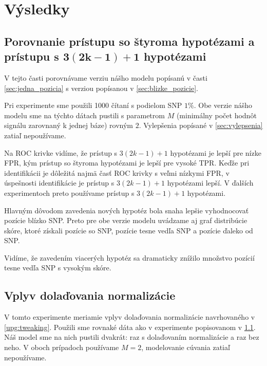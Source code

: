 \section{Výsledky}

\subsection[Porovnanie prístupu so štyroma hypotézami a prístupu s $3(2k-1)+1$ hypotézami]{Porovnanie prístupu so štyroma hypotézami a prístupu s $\boldsymbol{3(2k-1)+1}$ hypotézami}
\label{exp:4vsMany}
V tejto časti porovnávame verziu nášho modelu popísanú v časti \ref{sec:jedna_pozicia} s
verziou popísanou v \ref{sec:blizke_pozicie}.

Pri experimente sme použili 1000 čítaní s podielom SNP $1\%$.   Obe verzie nášho modelu sme na týchto dátach pustili s parametrom $M$ (minimálny počet hodnôt signálu zarovnaný k jednej báze) rovným $2$.
Vylepšenia popísané v \ref{sec:vylepsenia} zatiaľ nepoužívame.


Na ROC krivke vidíme, že prístup s $3(2k-1)+1$ hypotézami je lepší pre nízke FPR, 
kým prístup so štyroma
hypotézami je lepší pre vysoké TPR. Keďže pri identifikácii je dôležitá najmä časť ROC krivky s
veľmi nízkymi FPR, v úspešnosti identifikácie je prístup s $3(2k-1)+1$ hypotézami lepší. V ďalších 
experimentoch preto používame prístup s $3(2k-1)+1$ hypotézami.

Hlavným dôvodom zavedenia nových hypotéz bola snaha lepšie vyhodnocovať pozície blízko SNP. Preto 
pre obe verzie modelu uvádzame aj graf distribúcie skóre, ktoré získali pozície so SNP, pozície
tesne vedľa SNP a pozície ďaleko od SNP.


Vidíme, že zavedením viacerých hypotéz sa dramaticky znížilo množstvo pozícií tesne vedľa SNP s
vysokým skóre.

\subsection{Vplyv dolaďovania normalizácie}
\label{exp:tweaking}
V tomto experimente meriamie vplyv dolaďovania normalizácie navrhovaného v \ref{upg:tweaking}. Použili sme 
rovnaké dáta ako v experimente popisovanom v \ref{exp:4vsMany}. Náš model sme na nich pustili dvakrát: 
raz s dolaďovaním
normalizácie a raz bez neho. V oboch prípadoch používame $M=2$, modelovanie cúvania zatiaľ nepoužívame.

